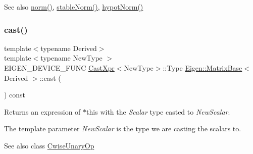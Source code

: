 \begin{DoxySeeAlso}{See also}
\mbox{\hyperlink{class_eigen_1_1_matrix_base_a5f6a3bc46add1f2e879ce15040e6987e}{norm()}}, \mbox{\hyperlink{class_eigen_1_1_matrix_base_ab84d3e64f855813b1eea4202c0697dc1}{stable\+Norm()}}, \mbox{\hyperlink{class_eigen_1_1_matrix_base_a32222d3b6677e6cdf0b801463f329b72}{hypot\+Norm()}} 
\end{DoxySeeAlso}
\mbox{\label{class_eigen_1_1_matrix_base_ae8dd1236cd87b33640529b91ccb6f6cd}} 
\subsubsection{\texorpdfstring{cast()}{cast()}}
{\footnotesize\ttfamily template$<$typename Derived$>$ \\
template$<$typename New\+Type $>$ \\
E\+I\+G\+E\+N\+\_\+\+D\+E\+V\+I\+C\+E\+\_\+\+F\+U\+NC \mbox{\hyperlink{struct_eigen_1_1_matrix_base_1_1_cast_xpr}{Cast\+Xpr}}$<$New\+Type$>$\+::Type \mbox{\hyperlink{class_eigen_1_1_matrix_base}{Eigen\+::\+Matrix\+Base}}$<$ Derived $>$\+::cast (\begin{DoxyParamCaption}{ }\end{DoxyParamCaption}) const\hspace{0.3cm}{\ttfamily [inline]}}

\begin{DoxyReturn}{Returns}
an expression of {\ttfamily $\ast$this} with the {\itshape Scalar} type casted to {\itshape New\+Scalar}.
\end{DoxyReturn}
The template parameter {\itshape New\+Scalar} is the type we are casting the scalars to.\begin{DoxySeeAlso}{See also}
class \mbox{\hyperlink{class_eigen_1_1_cwise_unary_op}{Cwise\+Unary\+Op}} 
\end{DoxySeeAlso}
\mbox{\label{class_eigen_1_1_matrix_base_adee8c19c833245bbb00a591dce68e8a4}} 
